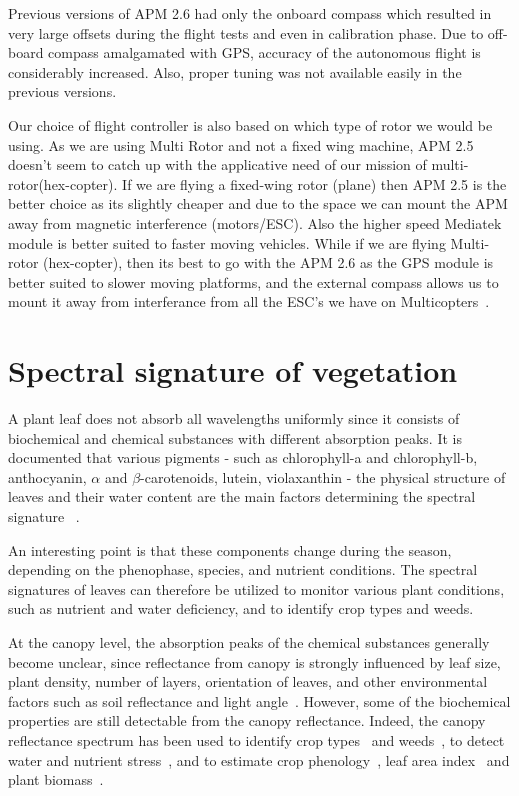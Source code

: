 Previous versions of APM 2.6 had only the onboard compass which resulted in very large offsets during the flight tests and even in calibration phase. Due to off-board compass amalgamated with GPS, accuracy of the autonomous flight is considerably increased. Also, proper tuning was not available easily in the previous versions.

Our choice of flight controller is also based on which type of rotor we would be using.  As we are using Multi Rotor and not a fixed wing machine, APM 2.5 doesn't seem to catch up with the applicative need of our mission of multi-rotor(hex-copter). If we are flying a fixed-wing rotor (plane) then APM 2.5 is the better choice as its slightly cheaper and due to the space we can mount the APM away from magnetic interference (motors/ESC). Also the higher speed Mediatek module is better suited to faster moving vehicles. While if we are flying Multi-rotor (hex-copter), then its best to go with the APM 2.6 as the GPS module is better suited to slower moving platforms, and the external compass allows us to mount it away from interferance from all the ESC's we have on Multicopters~\cite{APM25orA25:online}.



\section{Spectral signature of vegetation}

A plant leaf does not absorb all wavelengths uniformly since it consists of biochemical and chemical substances with different absorption peaks. It is documented that various pigments - such as chlorophyll-a and chlorophyll-b,  anthocyanin, $\alpha$ and $\beta$-carotenoids, lutein, violaxanthin - the physical structure of leaves and their water content are the main factors determining the spectral signature ~\cite{zwiggelaar1998review,campbell2011introduction}.

An interesting point is that these components change during the season, depending on the phenophase, species, and nutrient conditions. The spectral signatures of leaves can therefore be utilized to monitor various plant conditions, such as nutrient and water deficiency, and to identify crop types and weeds. 

At the canopy level, the absorption peaks of the chemical substances generally become unclear, since reflectance from canopy is strongly influenced by leaf size, plant density, number of layers, orientation of leaves, and other environmental factors such as soil reflectance and light angle~\cite{campbell2011introduction}. However, some of the biochemical properties are still detectable from the canopy reflectance. Indeed, the canopy reflectance spectrum has been used to identify crop types~\cite{serpico1996experimental} and weeds~\cite{goel2002use,goel2003potential,lamb1999evaluating,lass1996detection}, to detect water and nutrient stress~\cite{goel2002use,goel2003potential,lelong1998hyperspectral,shibayama1993canopy}, and to estimate crop phenology~\cite{railyan1993red,boissard1993reflectance}, leaf area index~\cite{aparicio2002relationship,rastogi2000estimation,shibayama1989seasonal} and plant biomass~\cite{serrano2000remote}.

